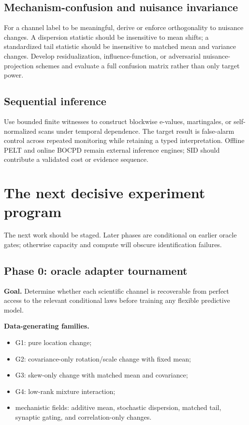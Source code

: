 \documentclass[10pt]{article}
\begin{document}
\subsection{Mechanism-confusion and nuisance invariance}

For a channel label to be meaningful, derive or enforce orthogonality to nuisance changes. A dispersion statistic should be insensitive to mean shifts; a standardized tail statistic should be insensitive to matched mean and variance changes. Develop residualization, influence-function, or adversarial nuisance-projection schemes and evaluate a full confusion matrix rather than only target power.

\subsection{Sequential inference}

Use bounded finite witnesses to construct blockwise e-values, martingales, or self-normalized scans under temporal dependence. The target result is false-alarm control across repeated monitoring while retaining a typed interpretation. Offline PELT and online BOCPD remain external inference engines; SID should contribute a validated cost or evidence sequence.

\section{The next decisive experiment program}

The next work should be staged. Later phases are conditional on earlier oracle gates; otherwise capacity and compute will obscure identification failures.

\subsection{Phase 0: oracle adapter tournament}

\textbf{Goal.} Determine whether each scientific channel is recoverable from perfect access to the relevant conditional laws before training any flexible predictive model.

\textbf{Data-generating families.}

\begin{itemize}
  \item G1: pure location change;
  \item G2: covariance-only rotation/scale change with fixed mean;
  \item G3: skew-only change with matched mean and covariance;
  \item G4: low-rank mixture interaction;
  \item mechanistic fields: additive mean, stochastic dispersion, matched tail, synaptic gating, and correlation-only changes.
\end{itemize}
\end{document}
